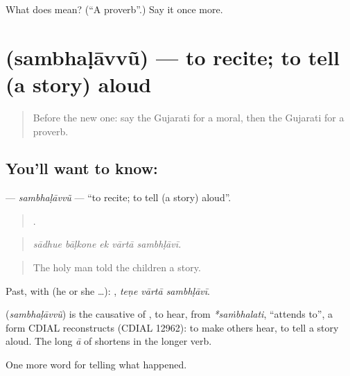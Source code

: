 \begin{tcolorbox}[breakable,colback=teal!4,colframe=teal!35!black,title={Before you move on}]
What does  mean? (\textquotedblleft{}A proverb\textquotedblright{}.) Say it once more.
\end{tcolorbox}
\section[\texorpdfstring{\gu{સંભળાવવું} (sambhaḷāvvũ)}{સંભળાવવું (sambhaḷāvvũ)}]{ (sambhaḷāvvũ) — to recite; to tell (a story) aloud}

\label{lesson:GU-C335-sambhalavvu}



\begin{quote}
Before the new one: say the Gujarati for a moral, then the Gujarati for a proverb.
\end{quote}

\subsection*{You'll want to know: }
\textbf{} — \emph{sambhaḷāvvũ} — \textquotedblleft{}to recite; to tell (a story) aloud\textquotedblright{}.

\begin{quote}
    .
\end{quote}

\begin{quote}
\emph{sādhue bāḷkone ek vārtā sambhḷāvī.}
\end{quote}

\begin{quote}
The holy man told the children a story.
\end{quote}

Past, with  (he or she …):   , \emph{teṇe vārtā sambhḷāvī}.

\begin{cousinweb}
\textbf{} (\emph{sambhaḷāvvũ}) is the causative of \textbf{}, to hear, from \emph{*saṁbhalati}, \textquotedblleft{}attends to\textquotedblright{}, a form CDIAL reconstructs (CDIAL 12962): to make others hear, to tell a story aloud. The long \emph{ā} of \textbf{} shortens in the longer verb.
\end{cousinweb}

\begin{grammarlens}[title={What you've built}]
One more word for telling what happened.
\end{grammarlens}

